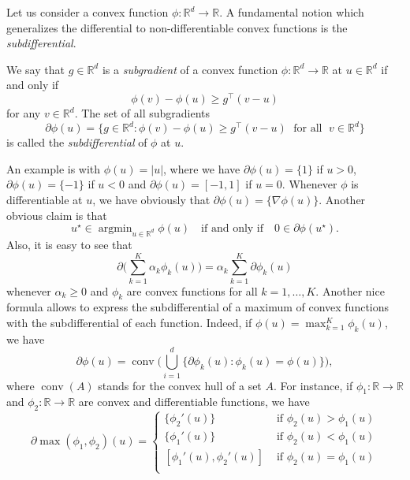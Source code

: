 \documentclass[
	fontsize=11pt, %
	twoside=false, %
	numbers=noenddot, %
]{kaobook}
\DeclareMathOperator*{\argmin}{argmin}
\newcommand{\R}{\mathbb R}
\newcommand{\grad}{\nabla}
\DeclareMathOperator{\conv}{conv}
\begin{document}
Let us consider a convex function $\phi : \R^d \rightarrow \R$.
A fundamental notion which generalizes the differential to non-differentiable convex functions is the \emph{subdifferential}.
\begin{definition}
	\label{def:subdifferential}
	We say that $g \in \R^d$ is a \emph{subgradient} of a convex function $\phi : \R^d \rightarrow \R$ at $u \in \R^d$ if and only if
	\begin{equation}
	 	\phi(v) - \phi(u) \geq g^\top (v - u)
	 \end{equation} 
	 for any $v \in \R^d$.
	 The set of all subgradients
	 \begin{equation*}
	 	\partial \phi(u) = \big\{ g \in \R^d : \phi(v) - \phi(u) \geq g^\top (v -u) 
	 	\; \text{ for all } \; v \in \R^d \}
	 \end{equation*}
	 is called the \emph{subdifferential} of $\phi$ at $u$.
\end{definition}
An example is with $\phi(u) = |u|$, where we have $\partial \phi(u) = \{ 1 \}$ if $u > 0$, $\partial \phi(u) = \{ -1 \}$ if $u < 0$ and $\partial \phi(u) = [-1, 1]$ if $u = 0$.
Whenever $\phi$ is differentiable at $u$, we have obviously that $\partial \phi(u) = \{  \grad \phi(u) \}$.
Another obvious claim is that
\begin{equation*}
	u^\star \in \argmin_{u \in \R^d} \phi(u) \quad \text{if and only if} \quad 0 \in \partial \phi(u^\star).
\end{equation*}
Also, it is easy to see that
\begin{equation*}
	\partial \Big( \sum_{k=1}^K \alpha_k \phi_k(u) \Big) =  \alpha_k \sum_{k=1}^K \partial \phi_k(u)
\end{equation*}
whenever $\alpha_k \geq 0$ and $\phi_k$ are convex functions for all $k=1, \ldots, K$.
Another nice formula allows to express the subdifferential of a maximum of convex functions with the subdifferential of each function.
Indeed, if $\phi(u) = \max_{k=1}^K \phi_k(u)$, we have
\begin{equation}
	\label{eq:subdifferential-max}
	\partial \phi(u) = \conv\Big( \bigcup_{i=1}^d \Big\{ \partial \phi_k(u) : \phi_k(u) = \phi(u) \Big\} \Big),
\end{equation}
where $\conv(A)$ stands for the convex hull of a set $A$.
For instance, if $\phi_1 : \R \rightarrow \R$ and $\phi_2 : \R \rightarrow \R$ are convex and differentiable functions, we have
\begin{equation*}
	\partial \max(\phi_1, \phi_2)(u) = 
	\begin{cases}
	\{ \phi_2'(u) \} &\text{ if } \phi_2(u) > \phi_1(u) \\
	\{ \phi_1'(u) \} &\text{ if } \phi_2(u) < \phi_1(u) \\
	[ \phi_1'(u), \phi_2'(u) ] &\text{ if } \phi_2(u) = \phi_1(u) \\
	\end{cases}
\end{equation*}
\end{document}
